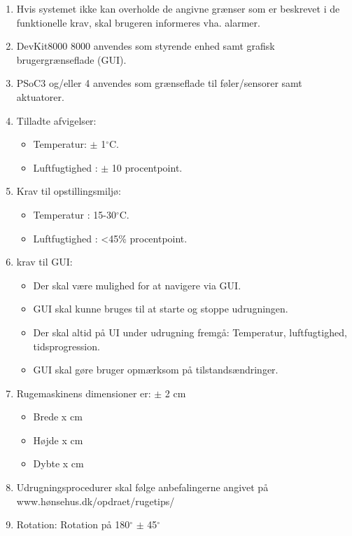 
\begin{enumerate}

\item Hvis systemet ikke kan overholde de angivne grænser som er beskrevet i de funktionelle krav, skal brugeren informeres vha. alarmer.

\item DevKit8000 8000 anvendes som styrende enhed samt grafisk brugergrænseflade (GUI).

\item PSoC3 og/eller 4 anvendes som grænseflade til føler/sensorer samt aktuatorer.

\item Tilladte afvigelser:
	\begin{itemize}
	\item Temperatur: $\pm$ 1$^\circ$C.
	\item Luftfugtighed : $\pm$ 10 procentpoint.
	\end{itemize}

\item Krav til opstillingsmiljø:
	\begin{itemize}
	\item Temperatur : 15-30$^\circ$C.
	\item Luftfugtighed : <45\% procentpoint.
	\end{itemize}

\item krav til GUI:
	\begin{itemize}
	\item Der skal være mulighed for at navigere via GUI.
	\item GUI skal kunne bruges til at starte og stoppe udrugningen.
	\item Der skal altid på UI under udrugning fremgå: Temperatur, luftfugtighed, tidsprogression.
	\item GUI skal gøre bruger opmærksom på tilstandsændringer.
	\end{itemize}

\item Rugemaskinens dimensioner er: $\pm$ 2 cm
	\begin{itemize}
	\item Brede x cm
	\item Højde x cm
	\item Dybte x cm
	\end{itemize}
		
\item Udrugningsprocedurer skal følge anbefalingerne angivet på www.hønsehus.dk/opdraet/rugetips/

\item Rotation: Rotation på 180$^\circ$ $\pm$ 45$^\circ$

\end{enumerate}
